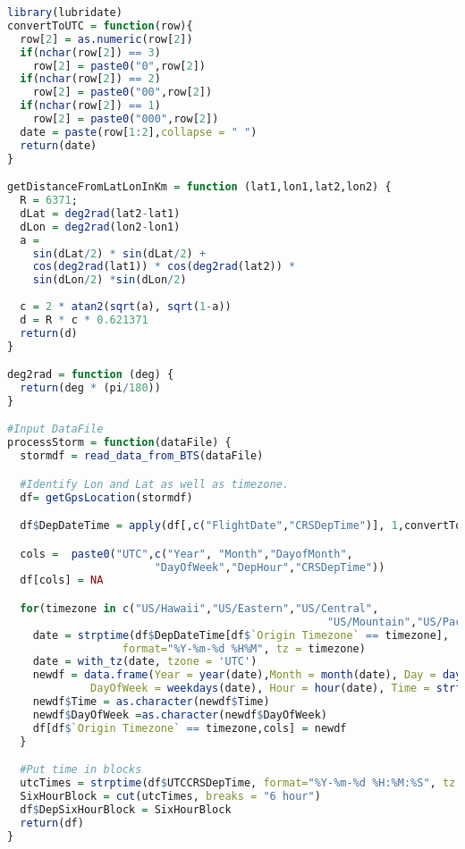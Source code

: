 \documentclass[12pt]{article}
\begin{document}
\begin{lstlisting}[language=R, caption=Data Merging in R]
library(lubridate)
convertToUTC = function(row){
  row[2] = as.numeric(row[2])
  if(nchar(row[2]) == 3)
    row[2] = paste0("0",row[2])
  if(nchar(row[2]) == 2)
    row[2] = paste0("00",row[2])
  if(nchar(row[2]) == 1)
    row[2] = paste0("000",row[2])
  date = paste(row[1:2],collapse = " ")
  return(date)
}

getDistanceFromLatLonInKm = function (lat1,lon1,lat2,lon2) {
  R = 6371;
  dLat = deg2rad(lat2-lat1)
  dLon = deg2rad(lon2-lon1) 
  a = 
    sin(dLat/2) * sin(dLat/2) +
    cos(deg2rad(lat1)) * cos(deg2rad(lat2)) * 
    sin(dLon/2) *sin(dLon/2)
  
  c = 2 * atan2(sqrt(a), sqrt(1-a))
  d = R * c * 0.621371
  return(d)
}

deg2rad = function (deg) {
  return(deg * (pi/180))
}

#Input DataFile
processStorm = function(dataFile) {
  stormdf = read_data_from_BTS(dataFile)

  #Identify Lon and Lat as well as timezone.
  df= getGpsLocation(stormdf)

  df$DepDateTime = apply(df[,c("FlightDate","CRSDepTime")], 1,convertToUTC)

  cols =  paste0("UTC",c("Year", "Month","DayofMonth",
                       "DayOfWeek","DepHour","CRSDepTime"))
  df[cols] = NA

  for(timezone in c("US/Hawaii","US/Eastern","US/Central",
                                                  "US/Mountain","US/Pacific","US/Alaska")){
    date = strptime(df$DepDateTime[df$`Origin Timezone` == timezone], 
                  format="%Y-%m-%d %H%M", tz = timezone)
    date = with_tz(date, tzone = 'UTC')
    newdf = data.frame(Year = year(date),Month = month(date), Day = day(date),
             DayOfWeek = weekdays(date), Hour = hour(date), Time = strftime(date, format="%Y-%m-%d %H:%M:%S"))
    newdf$Time = as.character(newdf$Time)
    newdf$DayOfWeek =as.character(newdf$DayOfWeek)
    df[df$`Origin Timezone` == timezone,cols] = newdf
  }

  #Put time in blocks
  utcTimes = strptime(df$UTCCRSDepTime, format="%Y-%m-%d %H:%M:%S", tz = 'UTC')
  SixHourBlock = cut(utcTimes, breaks = "6 hour")
  df$DepSixHourBlock = SixHourBlock 
  return(df)
}
\end{lstlisting}
\end{document}
